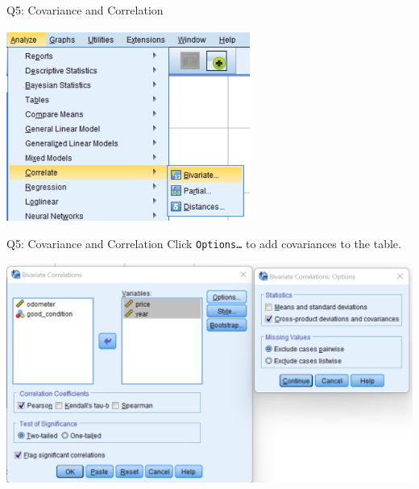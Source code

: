 \documentclass[11pt]{beamer}
\begin{document}
\begin{frame}{Q5: Covariance and Correlation}
  \begin{center}
    \includegraphics[width=0.6\textwidth]{f150-analyze-correlate-bivariate.png}
  \end{center}
\end{frame}

\begin{frame}{Q5: Covariance and Correlation}
  Click \texttt{Options\ldots} to add covariances to the table.
  \begin{center}
    \includegraphics[width=\textwidth]{f150-correlate-options.png}
  \end{center}
\end{frame}
\end{document}

